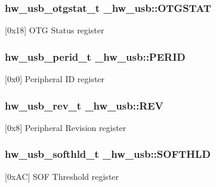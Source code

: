 \subsubsection[{\texorpdfstring{O\+T\+G\+S\+T\+AT}{OTGSTAT}}]{ {\bf hw\+\_\+usb\+\_\+otgstat\+\_\+t} \+\_\+hw\+\_\+usb\+::\+O\+T\+G\+S\+T\+AT}\hypertarget{struct__hw__usb_aee1151dac0f737be5b9a6f11acebc714}{}\label{struct__hw__usb_aee1151dac0f737be5b9a6f11acebc714}
\mbox{[}0x18\mbox{]} O\+TG Status register 
\subsubsection[{\texorpdfstring{P\+E\+R\+ID}{PERID}}]{ {\bf hw\+\_\+usb\+\_\+perid\+\_\+t} \+\_\+hw\+\_\+usb\+::\+P\+E\+R\+ID}\hypertarget{struct__hw__usb_aac327b4263bb45c6c8e4c391535fbb40}{}\label{struct__hw__usb_aac327b4263bb45c6c8e4c391535fbb40}
\mbox{[}0x0\mbox{]} Peripheral ID register 
\subsubsection[{\texorpdfstring{R\+EV}{REV}}]{ {\bf hw\+\_\+usb\+\_\+rev\+\_\+t} \+\_\+hw\+\_\+usb\+::\+R\+EV}\hypertarget{struct__hw__usb_a39b122e8ed52ba75da008496cf4f16ff}{}\label{struct__hw__usb_a39b122e8ed52ba75da008496cf4f16ff}
\mbox{[}0x8\mbox{]} Peripheral Revision register 
\subsubsection[{\texorpdfstring{S\+O\+F\+T\+H\+LD}{SOFTHLD}}]{ {\bf hw\+\_\+usb\+\_\+softhld\+\_\+t} \+\_\+hw\+\_\+usb\+::\+S\+O\+F\+T\+H\+LD}\hypertarget{struct__hw__usb_a75f453a65e5c69e71b5d7e8b556f3201}{}\label{struct__hw__usb_a75f453a65e5c69e71b5d7e8b556f3201}
\mbox{[}0x\+AC\mbox{]} S\+OF Threshold register 

